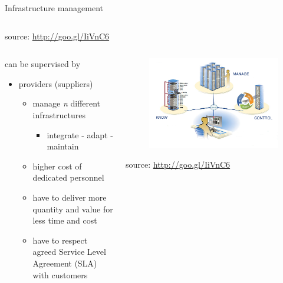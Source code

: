 \begin{frame}{Infrastructure management}
{\begin{columns}
\begin{column}{0.4\textwidth}
				\begin{flushright}
					\tiny{source: \url{http://goo.gl/IiVnC6}}
				\end{flushright}
			\end{column}
		\end{columns}
	}
	\only<2>
	{
		\begin{columns}
			\begin{column}{0.6\textwidth}
				can be supervised by
				\begin{itemize}
					\item{\footnotesize{providers (suppliers)}}
					\begin{itemize}
						\item{\scriptsize{manage \textit{n} different infrastructures}}
						\begin{itemize}
							\item{\tiny{integrate - adapt - maintain}}
						\end{itemize}
						\item{\scriptsize{higher cost of dedicated personnel}}
						\item{\scriptsize{have to deliver more quantity and value for less time and cost}}
						\item{\scriptsize{have to respect agreed Service Level Agreement (SLA) with customers}}
					\end{itemize}
				\end{itemize}
			\end{column}
			\begin{column}{0.4\textwidth}
				\begin{figure}
					\centering{}
					\includegraphics[scale=0.2]{images/scenarios.png}
				\end{figure}
				\begin{flushright}
					\tiny{source: \url{http://goo.gl/IiVnC6}}
				\end{flushright}
			\end{column}
		\end{columns}
	}
\end{frame}

